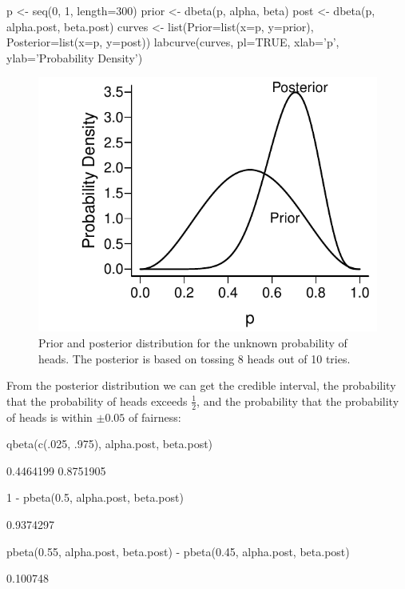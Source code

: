 \begin{Schunk}
\begin{Sinput}
p <- seq(0, 1, length=300)
prior <- dbeta(p, alpha, beta)
post  <- dbeta(p, alpha.post, beta.post)
curves <- list(Prior=list(x=p, y=prior),
               Posterior=list(x=p, y=post))
labcurve(curves, pl=TRUE, xlab='p', ylab='Probability Density')
\end{Sinput}
\begin{figure}[htbp]

\centerline{\includegraphics[width=\maxwidth]{htest-plotbetapost-1} }

\caption[Prior and posterior distributions for unknown probability of heads]{Prior and posterior distribution for the unknown probability of heads.  The posterior is based on tossing 8 heads out of 10 tries.}\label{fig:htest-plotbetapost}
\end{figure}
\end{Schunk}

\item From the posterior distribution we can get the credible interval, the
probability that the probability of heads exceeds $\frac{1}{2}$, and
the probability that the probability of heads is within $\pm
0.05$ of fairness:
\begin{Schunk}
\begin{Sinput}
qbeta(c(.025, .975), alpha.post, beta.post)
\end{Sinput}
\begin{Soutput}
[1] 0.4464199 0.8751905
\end{Soutput}
\begin{Sinput}
1 - pbeta(0.5, alpha.post, beta.post)
\end{Sinput}
\begin{Soutput}
[1] 0.9374297
\end{Soutput}
\begin{Sinput}
pbeta(0.55, alpha.post, beta.post) - pbeta(0.45, alpha.post, beta.post)
\end{Sinput}
\begin{Soutput}
[1] 0.100748
\end{Soutput}
\end{Schunk}

